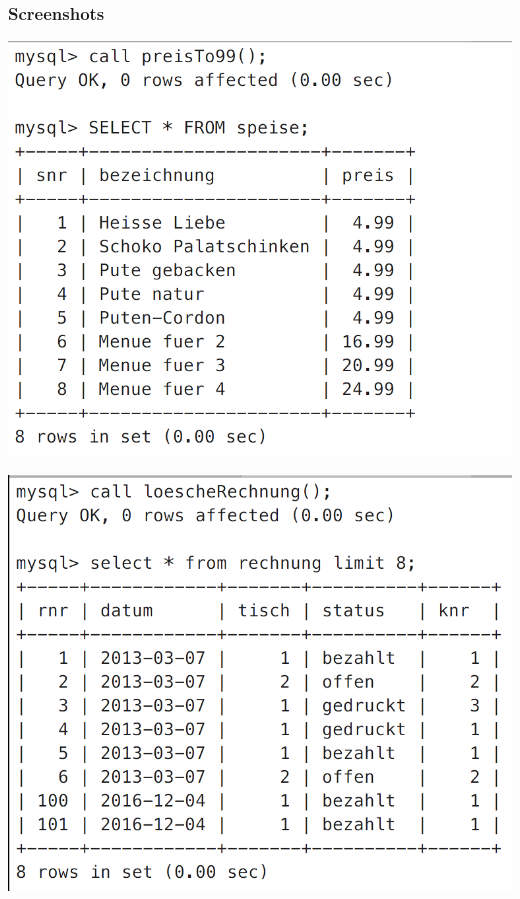 \subsubsection{Screenshots}
\vspace{0.2cm}
\begin{minipage}{.5\textwidth}
\includegraphics[width=1\linewidth]{images/s01.png}
\end{minipage}%
\begin{minipage}{.5\textwidth}
	\includegraphics[width=1\linewidth]{images/s02.png}
\end{minipage}

